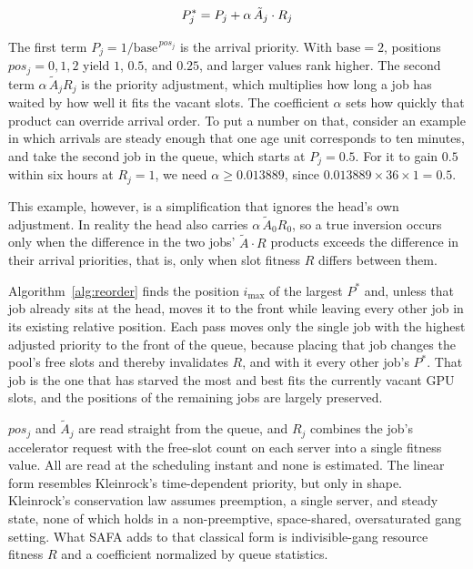 \documentclass{ieeetj}
\begin{document}
\begin{equation}
P^*_j = P_j + \alpha\, \tilde A_j \cdot R_j
\label{eq:01}
\vspace{2pt}
\end{equation}

The first term $P_j=1/\text{base}^{\,pos_j}$ is the arrival priority. With $\text{base}=2$, positions $pos_j=0,1,2$ yield $1$, $0.5$, and $0.25$, and larger values rank higher. The second term $\alpha\,\tilde A_j R_j$ is the priority adjustment, which multiplies how long a job has waited by how well it fits the vacant slots. The coefficient $\alpha$ sets how quickly that product can override arrival order. To put a number on that, consider an example in which arrivals are steady enough that one age unit corresponds to ten minutes, and take the second job in the queue, which starts at $P_j=0.5$. For it to gain $0.5$ within six hours at $R_j=1$, we need $\alpha\ge0.013889$, since $0.013889\times36\times1=0.5$.

This example, however, is a simplification that ignores the head's own adjustment. In reality the head also carries $\alpha\,\tilde A_0 R_0$, so a true inversion occurs only when the difference in the two jobs' $\tilde A\cdot R$ products exceeds the difference in their arrival priorities, that is, only when slot fitness $R$ differs between them.

Algorithm~\ref{alg:reorder} finds the position $i_{\max}$ of the largest $P^*$ and, unless that job already sits at the head, moves it to the front while leaving every other job in its existing relative position. Each pass moves only the single job with the highest adjusted priority to the front of the queue, because placing that job changes the pool's free slots and thereby invalidates $R$, and with it every other job's $P^*$. That job is the one that has starved the most and best fits the currently vacant GPU slots, and the positions of the remaining jobs are largely preserved.

$pos_j$ and $\tilde A_j$ are read straight from the queue, and $R_j$ combines the job's accelerator request with the free-slot count on each server into a single fitness value. All are read at the scheduling instant and none is estimated. The linear form resembles Kleinrock's time-dependent priority\cite{kleinrock1976queueing}, but only in shape. Kleinrock's conservation law assumes preemption, a single server, and steady state, none of which holds in a non-preemptive, space-shared, oversaturated gang setting. What SAFA adds to that classical form is indivisible-gang resource fitness $R$ and a coefficient normalized by queue statistics.
\end{document}
